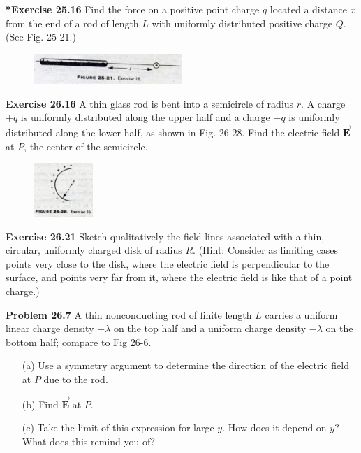 \documentclass[letter,11pt]{article}
\begin{document}
\newpage

\textbf{*Exercise 25.16} Find the force on a positive point charge $q$ located a distance $x$ from the end of a rod of length $L$ with uniformly distributed positive charge $Q$. (See Fig. 25-21.)

\begin{figure}[h!]
	\centering
	\includegraphics[width=0.5\textwidth]{fig25-21.jpeg}
\end{figure}

\newpage

\textbf{Exercise 26.16} A thin glass rod is bent into a semicircle of radius $r$. A charge $+q$ is uniformly distributed along the upper half and a charge $-q$ is uniformly distributed along the lower half, as shown in Fig. 26-28. Find the electric field $\mathbf{\vec{E}}$ at $P$, the center of the semicircle.

\begin{figure}[h!]
	\centering
	\includegraphics[width=0.2\textwidth]{fig26-28.jpeg}
\end{figure}

\newpage

\textbf{Exercise 26.21} Sketch qualitatively the field lines associated with a thin, circular, uniformly charged disk of radius $R$. (Hint: Consider as limiting cases points very close to the disk, where the electric field is perpendicular to the surface, and points very far from it, where the electric field is like that of a point charge.)

\newpage

\textbf{Problem 26.7} A thin nonconducting rod of finite length $L$ carries a uniform linear charge density $+\lambda$ on the top half and a uniform charge density $-\lambda$ on the bottom half; compare to Fig 26-6.
\begin{enumerate}
	\item[(a)] Use a symmetry argument to determine the direction of the electric field at $P$ due to the rod.
	\item[(b)] Find $\vec{\mathbf{E}}$ at $P$.
	\item[(c)] Take the limit of this expression for large $y$. How does it depend on $y$? What does this remind you of?
\end{enumerate}
\end{document}
